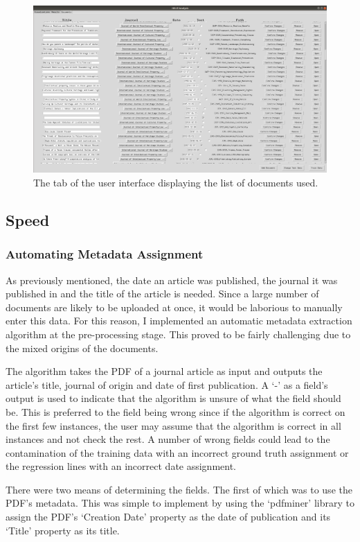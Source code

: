 				\begin{figure}
    				\centering
    				\includegraphics[width=0.9\linewidth]{resources/images/ui_documents.png}
    				\caption{The tab of the user interface displaying the list of documents used.}
    				\label{fig:ui_documents}
				\end{figure}
				
		\subsection{Speed}
			\subsubsection{Automating Metadata Assignment}
				As previously mentioned, the date an article was published, the journal it was published in and the title of the article is needed. Since a large number of documents are likely to be uploaded at once, it would be laborious to manually enter this data. For this reason, I implemented an automatic metadata extraction algorithm at the pre-processing stage. This proved to be fairly challenging due to the mixed origins of the documents.
				
				The algorithm takes the PDF of a journal article as input and outputs the article's title, journal of origin and date of first publication. A `-' as a field's output is used to indicate that the algorithm is unsure of what the field should be. This is preferred to the field being wrong since if the algorithm is correct on the first few instances, the user may assume that the algorithm is correct in all instances and not check the rest. A number of wrong fields could lead to the contamination of the training data with an incorrect ground truth assignment or the regression lines with an incorrect date assignment. 
				
				There were two means of determining the fields. The first of which was to use the PDF's metadata. This was simple to implement by using the `pdfminer' library to assign the PDF's `Creation Date' property as the date of publication and its `Title' property as its title.
				
